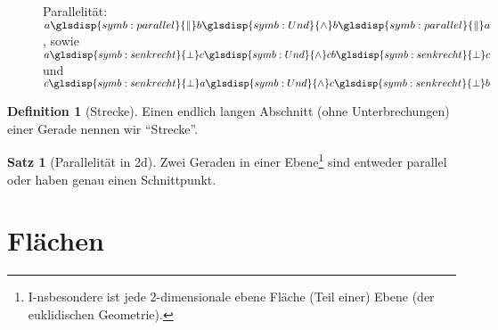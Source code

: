 \documentclass[a4paper]{book}%
\theoremstyle{definition}
\newtheorem{definition}{Definition}
\newtheorem{satz}{Satz}
\begin{document}
\begin{figure}
  \centering
    $\quad$

  \caption{Parallelität: $a \glsdisp{symb:parallel}{\|} b \glsdisp{symb:Und}{\wedge} b \glsdisp{symb:parallel}{\|} a$, sowie $a \glsdisp{symb:senkrecht}{\bot} c \glsdisp{symb:Und}{\wedge} c b \glsdisp{symb:senkrecht}{\bot} c$ und $c \glsdisp{symb:senkrecht}{\bot} a \glsdisp{symb:Und}{\wedge} c \glsdisp{symb:senkrecht}{\bot} b$}\label{fig:Parallelitaet}
\end{figure}



\begin{definition}[Strecke]\label{def:Strecke}
    Einen endlich langen Abschnitt (ohne Unterbrechungen) einer Gerade nennen wir \enquote{Strecke}.
\end{definition}

\begin{satz}[Parallelität in 2d]\label{def:Parallele}
    Zwei Geraden in einer Ebene\footnote{I-nsbesondere ist jede 2-dimensionale ebene Fläche (Teil einer) Ebene (der euklidischen Geometrie).} sind entweder parallel oder haben genau einen Schnittpunkt.
\end{satz}

\section{Flächen}
\end{document}
